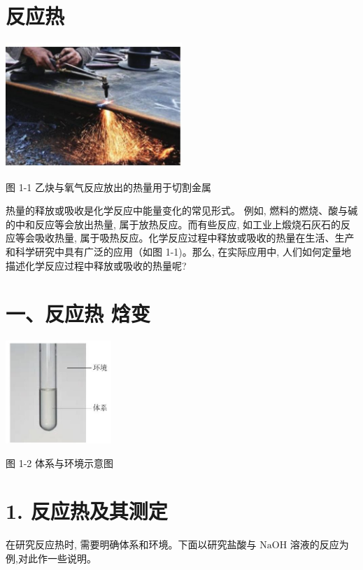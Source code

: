 \documentclass[10pt]{article}
\begin{document}
\section*{反应热}

\begin{center}
\includegraphics[max width=0.5\textwidth]{images/0190da9d-8bfd-732f-bc2c-0b21d0f13b91_9_498503.jpg}
\end{center}

图 1-1 乙炔与氧气反应放出的热量用于切割金属

热量的释放或吸收是化学反应中能量变化的常见形式。 例如, 燃料的燃烧、酸与碱的中和反应等会放出热量, 属于放热反应。而有些反应, 如工业上煅烧石灰石的反应等会吸收热量, 属于吸热反应。化学反应过程中释放或吸收的热量在生活、生产和科学研究中具有广泛的应用（如图 1-1)。那么, 在实际应用中, 人们如何定量地描述化学反应过程中释放或吸收的热量呢?

\section*{一、反应热 焓变}

\begin{center}
\includegraphics[max width=0.3\textwidth]{images/0190da9d-8bfd-732f-bc2c-0b21d0f13b91_9_225809.jpg}
\end{center}

图 1-2 体系与环境示意图

\section*{1. 反应热及其测定}

在研究反应热时, 需要明确体系和环境。下面以研究盐酸与 \(\mathrm{{NaOH}}\) 溶液的反应为例,对此作一些说明。
\end{document}
